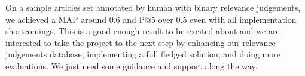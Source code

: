 \documentclass[article]{IEEEtran}
\begin{document}
On a sample articles set annotated by human with binary relevance judgements, we achieved a MAP around 0.6 and P@5 over 0.5         even with all implementation shortcomings. This is a good enough result to be excited about and we are interested to take the project to the next step by enhancing our relevance judgements database, implementing a full fledged solution, and doing more evaluations. We just need some guidance and support along the way. 


 
\end{document}
